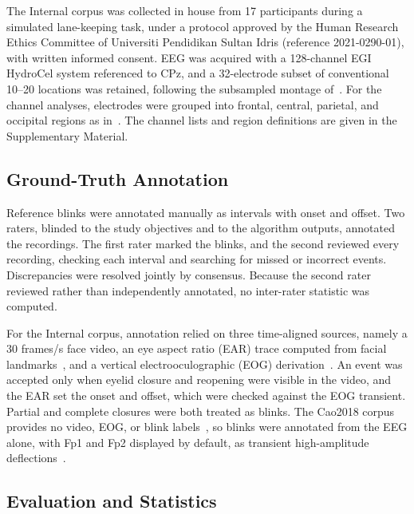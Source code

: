 \documentclass[journal,twoside,web]{ieeecolor}
\begin{document}
The Internal corpus was collected in house from 17 participants during a simulated lane-keeping task, under a protocol approved by the Human Research Ethics Committee of Universiti Pendidikan Sultan Idris (reference 2021-0290-01), with written informed consent. EEG was acquired with a 128-channel EGI HydroCel system referenced to CPz, and a 32-electrode subset of conventional 10--20 locations was retained, following the subsampled montage of~\citep{Hatlestad_2023_reliable}. For the channel analyses, electrodes were grouped into frontal, central, parietal, and occipital regions as in~\citep{black2012}. The channel lists and region definitions are given in the Supplementary Material.

\subsection{Ground-Truth Annotation}\label{sec:annotation}

Reference blinks were annotated manually as intervals with onset and offset. Two raters, blinded to the study objectives and to the algorithm outputs, annotated the recordings. The first rater marked the blinks, and the second reviewed every recording, checking each interval and searching for missed or incorrect events. Discrepancies were resolved jointly by consensus. Because the second rater reviewed rather than independently annotated, no inter-rater statistic was computed.

For the Internal corpus, annotation relied on three time-aligned sources, namely a 30 frames/s face video, an eye aspect ratio (EAR) trace computed from facial landmarks~\citep{soukupova2016realtime}, and a vertical electrooculographic (EOG) derivation~\citep{croft2000removal}. An event was accepted only when eyelid closure and reopening were visible in the video, and the EAR set the onset and offset, which were checked against the EOG transient. Partial and complete closures were both treated as blinks. The Cao2018 corpus provides no video, EOG, or blink labels~\citep{cao2019multichannel}, so blinks were annotated from the EEG alone, with Fp1 and Fp2 displayed by default, as transient high-amplitude deflections~\citep{iwasaki2005effects,croft2000removal,kleifges2017blinker}.

\subsection{Evaluation and Statistics}\label{sec:metrics}
\end{document}
